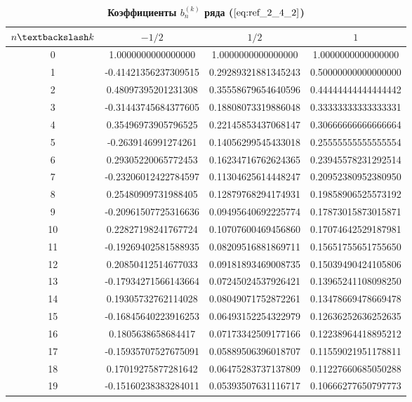 \begin{table}[]
\caption{\textbf{Коэффициенты $b_n^{(k)}$ ряда ($\ref{eq:ref_2_4_2}$)}}
\begin{center}
\begin{tabular}{|c|c|c|c|}
\hline
$n \textbackslash k$ & $-1/2$ & $1/2$ & $1$ \\
\hline
0  &  1.0000000000000000  & 1.0000000000000000  & 1.0000000000000000 \\
1  & -0.41421356237309515 & 0.29289321881345243 & 0.50000000000000000 \\
2  &  0.48097395201231308 & 0.35558679654640596 & 0.44444444444444442 \\
3  & -0.31443745684377605 & 0.18808073319886048 & 0.33333333333333331 \\
4  &  0.35496973905796525 & 0.22145853437068147 & 0.30666666666666664 \\
5  & -0.2639146991274261  & 0.14056299545433018 & 0.25555555555555554 \\
6  &  0.29305220065772453 & 0.16234716762624365 & 0.23945578231292514 \\
7  & -0.23206012422784597 & 0.11304625614448247 & 0.20952380952380950 \\
8  &  0.25480909731988405 & 0.12879768294174931 & 0.19858906525573192 \\
9  & -0.20961507725316636 & 0.09495640692225774 & 0.17873015873015871 \\
10 & 0.22827198241767724  & 0.10707600469456860 & 0.17074642529187981 \\
11 & -0.19269402581588935 & 0.08209516881869711 & 0.15651755651755650 \\
12 &  0.20850412514677033 & 0.09181893469008735 & 0.15039490424105806 \\
13 & -0.17934271566143664 & 0.07245024537926421 & 0.13965241108098250 \\
14 &  0.19305732762114028 & 0.08049071752872261 & 0.13478669478669478 \\
15 & -0.16845640223916253 & 0.06493152254322979 & 0.12636252636252635 \\
16 &  0.1805638658684417  & 0.07173342509177166 & 0.12238964418895212 \\
17 & -0.15935707527675091 & 0.05889506396018707 & 0.11559021951178811 \\
18 &  0.17019275877281642 & 0.06475283737137809 & 0.11227660685050288 \\
19 & -0.15160238383284011 & 0.05393507631116717 & 0.10666277650797773 \\

\end{tabular}
\end{center}
\end{table}
